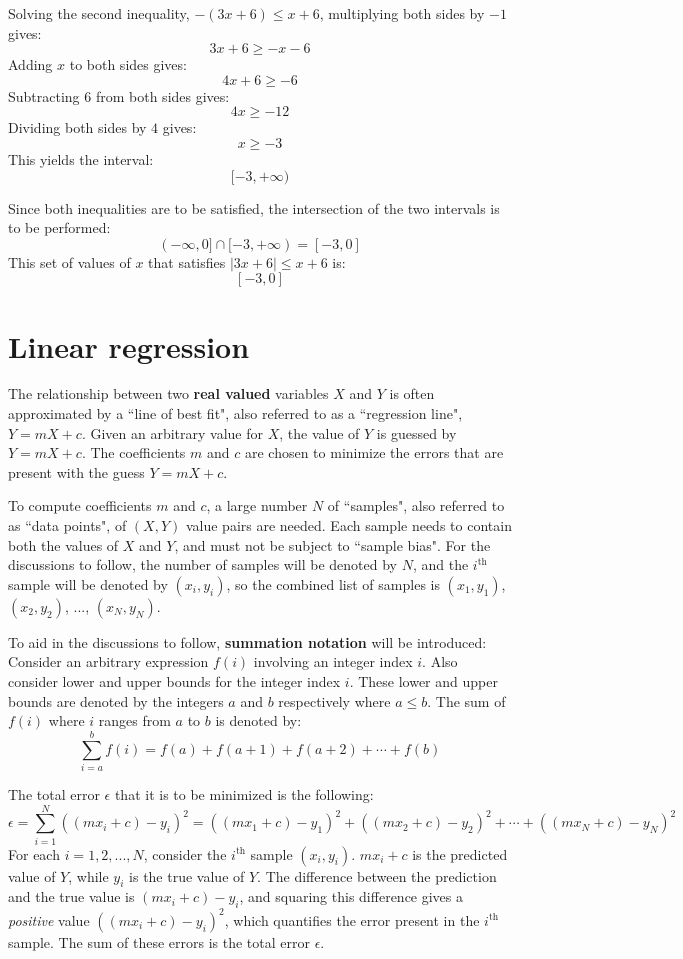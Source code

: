 \documentclass{article}
\begin{document}
Solving the second inequality, \(-(3x + 6) \leq x + 6\), multiplying both sides by \(-1\) gives:
\[3x + 6 \geq -x - 6\]
Adding \(x\) to both sides gives:
\[4x + 6 \geq -6\]
Subtracting \(6\) from both sides gives:
\[4x \geq -12\]
Dividing both sides by \(4\) gives:
\[x \geq -3\]
This yields the interval:
\[[-3, +\infty)\]

Since both inequalities are to be satisfied, the intersection of the two intervals is to be performed:
\[(-\infty, 0] \cap [-3, +\infty) = [-3, 0]\]
This set of values of \(x\) that satisfies \(|3x + 6| \leq x + 6\) is:
\[[-3, 0]\]




\section*{Linear regression}

The relationship between two {\bf real valued} variables \(X\) and \(Y\) is often approximated by a ``line of best fit", also referred to as a ``regression line", \(Y = mX + c\). Given an arbitrary value for \(X\), the value of \(Y\) is guessed by \(Y = mX + c\). The coefficients \(m\) and \(c\) are chosen to minimize the errors that are present with the guess \(Y = mX + c\). 

To compute coefficients \(m\) and \(c\), a large number \(N\) of ``samples", also referred to as ``data points", of \((X, Y)\) value pairs are needed. Each sample needs to contain both the values of \(X\) and \(Y\), and must not be subject to ``sample bias". For the discussions to follow, the number of samples will be denoted by \(N\), and the \(i^\text{th}\) sample will be denoted by \((x_i, y_i)\), so the combined list of samples is \((x_1, y_1)\), \((x_2, y_2)\), ..., \((x_N, y_N)\).    

To aid in the discussions to follow, {\bf summation notation} will be introduced: Consider an arbitrary expression \(f(i)\) involving an integer index \(i\). Also consider lower and upper bounds for the integer index \(i\). These lower and upper bounds are denoted by the integers \(a\) and \(b\) respectively where \(a \leq b\). The sum of \(f(i)\) where \(i\) ranges from \(a\) to \(b\) is denoted by:
\[\sum_{i=a}^b f(i) = f(a) + f(a+1) + f(a+2) + \cdots + f(b)\] 

The total error \(\epsilon\) that it is to be minimized is the following:
\[\epsilon = \sum_{i=1}^N ((mx_i + c) - y_i)^2 = ((mx_1 + c) - y_1)^2 + ((mx_2 + c) - y_2)^2 + \cdots + ((mx_N + c) - y_N)^2\]
For each \(i = 1, 2, ..., N\), consider the \(i^\text{th}\) sample \((x_i, y_i)\). \(mx_i + c\) is the predicted value of \(Y\), while \(y_i\) is the true value of \(Y\). The difference between the prediction and the true value is \((mx_i + c) - y_i\), and squaring this difference gives a \emph{positive} value \(((mx_i + c) - y_i)^2\), which quantifies the error present in the \(i^\text{th}\) sample. The sum of these errors is the total error \(\epsilon\).
\end{document}
